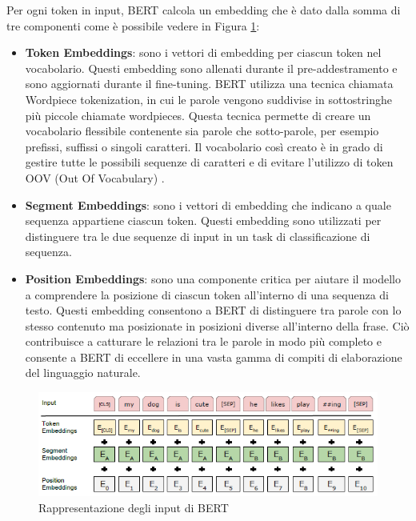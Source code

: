 \documentclass[../../Thesis.tex]{subfiles}
\begin{document}
Per ogni token in input, BERT calcola un embedding che è dato dalla somma di tre componenti come è possibile vedere in Figura \ref{fig:bert_embedding}:
\begin{itemize}
    \item \textbf{Token Embeddings}: sono i vettori di embedding per ciascun token nel vocabolario. Questi embedding sono allenati durante il pre-addestramento e sono aggiornati durante il fine-tuning. BERT utilizza una tecnica chiamata Wordpiece tokenization, in cui le parole vengono
    suddivise in sottostringhe più piccole chiamate wordpieces. Questa tecnica permette di
    creare un vocabolario flessibile contenente sia parole che sotto-parole, per esempio
    prefissi, suffissi o singoli caratteri. Il vocabolario così creato è in grado di gestire tutte le
    possibili sequenze di caratteri e di evitare l'utilizzo di token OOV (Out Of Vocabulary) \cite{WordPiece}.
    \item \textbf{Segment Embeddings}: sono i vettori di embedding che indicano a quale sequenza appartiene ciascun token. Questi embedding sono utilizzati per distinguere tra le due sequenze di input in un task di classificazione di sequenza.
    \item \textbf{Position Embeddings}: sono una componente critica per aiutare il modello a comprendere la posizione di ciascun token all'interno di una sequenza di testo. Questi embedding consentono a BERT di distinguere tra parole con lo stesso contenuto ma posizionate in posizioni diverse all'interno della frase. Ciò contribuisce a catturare le relazioni tra le parole in modo più completo e consente a BERT di eccellere in una vasta gamma di compiti di elaborazione del linguaggio naturale.
\end{itemize}

\begin{figure}[H]
    \centering
    \includegraphics[width=\textwidth]{../../img/bert-input.png}
    \caption{Rappresentazione degli input di BERT}
    \label{fig:bert_embedding}
\end{figure}
\end{document}
